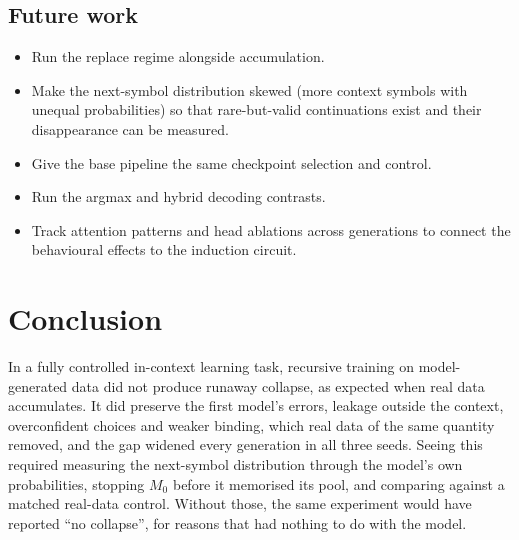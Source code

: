 \documentclass[11pt,a4paper]{article}
\DeclareRobustCommand{\code}[1]{\begingroup\ttfamily\def\_{\textunderscore\allowbreak}#1\endgroup}
\begin{document}
\subsection{Future work}
\begin{itemize}[leftmargin=1.4em]
  \item Run the replace regime alongside accumulation.
  \item Make the next-symbol distribution skewed (more context symbols with
        unequal probabilities) so that rare-but-valid continuations exist and
        their disappearance can be measured.
  \item Give the base pipeline the same checkpoint selection and control.
  \item Run the \code{argmax} and \code{hybrid} decoding contrasts.
  \item Track attention patterns and head ablations across generations to
        connect the behavioural effects to the induction circuit.
\end{itemize}

\section{Conclusion}
In a fully controlled in-context learning task, recursive training on
model-generated data did not produce runaway collapse, as expected when real
data accumulates. It did preserve the first model's errors, leakage outside
the context, overconfident choices and weaker binding, which real data of the
same quantity removed, and the gap widened every generation in all three
seeds. Seeing this required measuring the next-symbol distribution through the
model's own probabilities, stopping $M_0$ before it memorised its pool, and
comparing against a matched real-data control. Without those, the same
experiment would have reported ``no collapse'', for reasons that had nothing to
do with the model.

\appendix
\end{document}
